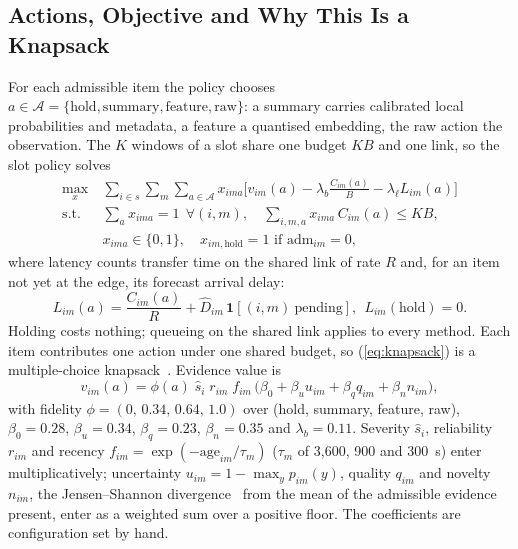 \subsection{Actions, Objective and Why This Is a Knapsack}
For each admissible item the policy chooses $a\in\mathcal A=\{\text{hold},\text{summary},\text{feature},\text{raw}\}$: a summary carries calibrated local probabilities and metadata, a feature a quantised embedding, the raw action the observation. The $K$ windows of a slot share one budget $KB$ and one link, so the slot policy solves
\begin{align}
\label{eq:knapsack}
\max_{x}\ & \sum_{i\in s}\sum_{m}\sum_{a\in\mathcal A} x_{ima}\Big[v_{im}(a)-\lambda_b\tfrac{C_{im}(a)}{B}-\lambda_\ell L_{im}(a)\Big] \nonumber\\
\text{s.t.}\ & \textstyle\sum_{a} x_{ima}=1\ \ \forall (i,m),\quad \sum_{i,m,a} x_{ima}\,C_{im}(a)\le KB, \nonumber\\
& x_{ima}\in\{0,1\},\quad x_{im,\text{hold}}=1 \text{ if } \mathrm{adm}_{im}=0,
\end{align}
where latency counts transfer time on the shared link of rate $R$ and, for an item not yet at the edge, its forecast arrival delay:
\begin{equation}
\label{eq:latency}
L_{im}(a)=\frac{C_{im}(a)}{R}+\hat D_{im}\,\mathbf 1[(i,m)\ \text{pending}],\ \ L_{im}(\text{hold})=0.
\end{equation}
Holding costs nothing; queueing on the shared link applies to every method. Each item contributes one action under one shared budget, so (\ref{eq:knapsack}) is a multiple-choice knapsack~\cite{knapsack}. Evidence value is
\begin{equation}
\label{eq:value}
v_{im}(a)=\phi(a)\;\hat s_i\; r_{im}\; f_{im}\,\big(\beta_0+\beta_u u_{im}+\beta_q q_{im}+\beta_n n_{im}\big),
\end{equation}
with fidelity $\phi=(0,\,0.34,\,0.64,\,1.0)$ over (hold, summary, feature, raw), $\beta_0=0.28$, $\beta_u=0.34$, $\beta_q=0.23$, $\beta_n=0.35$ and $\lambda_b=0.11$. Severity $\hat s_i$, reliability $r_{im}$ and recency $f_{im}=\exp(-\mathrm{age}_{im}/\tau_m)$ ($\tau_m$ of 3,600, 900 and 300~s) enter multiplicatively; uncertainty $u_{im}=1-\max_y p_{im}(y)$, quality $q_{im}$ and novelty $n_{im}$, the Jensen--Shannon divergence~\cite{lin} from the mean of the admissible evidence present, enter as a weighted sum over a positive floor. The coefficients are configuration set by hand.

